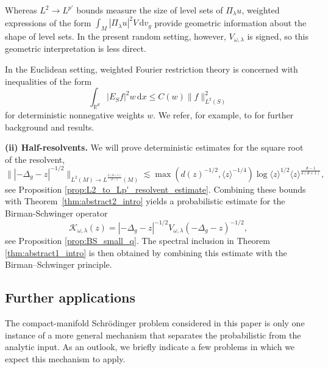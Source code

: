 \documentclass[12pt,reqno]{amsart}
\theoremstyle{definition}
\theoremstyle{remark}
\numberwithin{equation}{section}
\newcommand{\1}{\mathbbm{1}}
\newcommand{\R}{\mathbb{R}}
\def\rd{\mathrm{d}}
\begin{document}
Whereas \(L^2\to L^{p'}\) bounds measure the size of level sets of \(\Pi_\lambda u\), weighted expressions of the form
\(\int_M |\Pi_\lambda u|^2 V\,\mathrm{d}v_g\)
 provide geometric information about the shape of level sets. In the present random setting, however, \(V_{\omega,\lambda}\) is signed, so this geometric interpretation is less direct.


In the Euclidean setting, weighted Fourier restriction theory is concerned with inequalities of the form
\[
\int_{\R^d}|E_Sf|^2w\,\rd x\leq C(w)\|f\|_{L^2(S)}^2
\]
for deterministic nonnegative weights \(w\). We refer, for example, to \cite{MR4980305,MR4759602} for further background and results.

\medskip

\noindent
\textbf{(ii) Half-resolvents.}
We will prove deterministic estimates for the square root of the resolvent,
\[
\bigl\||-\Delta_g-z|^{-1/2}\bigr\|_{L^2(M)\to L^{\frac{2(d+1)}{d-1}}(M)}
\lesssim
\max(d(z)^{-1/2},\langle z\rangle^{-1/4})
    \log\langle z\rangle^{1/2}
    \langle z\rangle^{\frac{d-1}{4(d+1)}},
\]
see Proposition \ref{prop:L2_to_Lp'_resolvent_estimate}.
Combining these bounds with Theorem~\ref{thm:abstract2_intro} yields a probabilistic estimate for the Birman-Schwinger operator
\[
\mathcal K_{\omega,\lambda}(z)
=
|-\Delta_g-z|^{-1/2}
V_{\omega,\lambda}
(-\Delta_g-z)^{-1/2},
\]
see Proposition \ref{prop:BS_small_q}. The spectral inclusion in Theorem \ref{thm:abstract1_intro} is then obtained by combining this estimate with the Birman--Schwinger principle.


\subsection{Further applications}

The compact-manifold Schr\"odinger problem considered in this paper is only one instance of a more general mechanism that separates the probabilistic from the analytic input.
As an outlook, we briefly indicate a few problems in which we expect this mechanism to apply.
\end{document}
